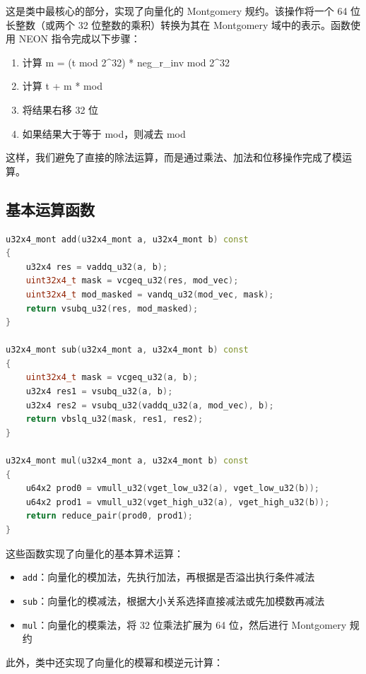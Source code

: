 \documentclass[a4paper]{article}
\begin{document}
这是类中最核心的部分，实现了向量化的 Montgomery 规约。该操作将一个 64 位长整数（或两个 32 位整数的乘积）转换为其在 Montgomery 域中的表示。函数使用 NEON 指令完成以下步骤：

\begin{enumerate}
    \item 计算 m = (t mod 2\^{}32) * neg\_r\_inv mod 2\^{}32
    \item 计算 t + m * mod
    \item 将结果右移 32 位
    \item 如果结果大于等于 mod，则减去 mod
\end{enumerate}

这样，我们避免了直接的除法运算，而是通过乘法、加法和位移操作完成了模运算。

\subsection{基本运算函数}

\begin{lstlisting}[language=C++]
u32x4_mont add(u32x4_mont a, u32x4_mont b) const
{
    u32x4 res = vaddq_u32(a, b);
    uint32x4_t mask = vcgeq_u32(res, mod_vec);
    uint32x4_t mod_masked = vandq_u32(mod_vec, mask);
    return vsubq_u32(res, mod_masked);
}

u32x4_mont sub(u32x4_mont a, u32x4_mont b) const
{
    uint32x4_t mask = vcgeq_u32(a, b);
    u32x4 res1 = vsubq_u32(a, b);
    u32x4 res2 = vsubq_u32(vaddq_u32(a, mod_vec), b);
    return vbslq_u32(mask, res1, res2);
}

u32x4_mont mul(u32x4_mont a, u32x4_mont b) const
{
    u64x2 prod0 = vmull_u32(vget_low_u32(a), vget_low_u32(b));
    u64x2 prod1 = vmull_u32(vget_high_u32(a), vget_high_u32(b));
    return reduce_pair(prod0, prod1);
}
\end{lstlisting}

这些函数实现了向量化的基本算术运算：

\begin{itemize}
    \item \texttt{add}：向量化的模加法，先执行加法，再根据是否溢出执行条件减法
    \item \texttt{sub}：向量化的模减法，根据大小关系选择直接减法或先加模数再减法
    \item \texttt{mul}：向量化的模乘法，将 32 位乘法扩展为 64 位，然后进行 Montgomery 规约
\end{itemize}

此外，类中还实现了向量化的模幂和模逆元计算：
\end{document}

